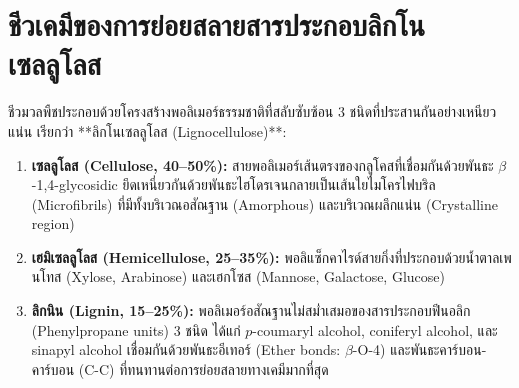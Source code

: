 \section{ชีวเคมีของการย่อยสลายสารประกอบลิกโนเซลลูโลส}

ชีวมวลพืชประกอบด้วยโครงสร้างพอลิเมอร์ธรรมชาติที่สลับซับซ้อน 3 ชนิดที่ประสานกันอย่างเหนียวแน่น เรียกว่า **ลิกโนเซลลูโลส (Lignocellulose)**:
\begin{enumerate}
    \item \textbf{เซลลูโลส (Cellulose, 40--50\%):} สายพอลิเมอร์เส้นตรงของกลูโคสที่เชื่อมกันด้วยพันธะ $\beta$-1,4-glycosidic ยึดเหนี่ยวกันด้วยพันธะไฮโดรเจนกลายเป็นเส้นใยไมโครไฟบริล (Microfibrils) ที่มีทั้งบริเวณอสัณฐาน (Amorphous) และบริเวณผลึกแน่น (Crystalline region)
    \item \textbf{เฮมิเซลลูโลส (Hemicellulose, 25--35\%):} พอลิแซ็กคาไรด์สายกิ่งที่ประกอบด้วยน้ำตาลเพนโทส (Xylose, Arabinose) และเฮกโซส (Mannose, Galactose, Glucose)
    \item \textbf{ลิกนิน (Lignin, 15--25\%):} พอลิเมอร์อสัณฐานไม่สม่ำเสมอของสารประกอบฟีนอลิก (Phenylpropane units) 3 ชนิด ได้แก่ $p$-coumaryl alcohol, coniferyl alcohol, และ sinapyl alcohol เชื่อมกันด้วยพันธะอีเทอร์ (Ether bonds: $\beta$-O-4) และพันธะคาร์บอน-คาร์บอน (C-C) ที่ทนทานต่อการย่อยสลายทางเคมีมากที่สุด
\end{enumerate}

